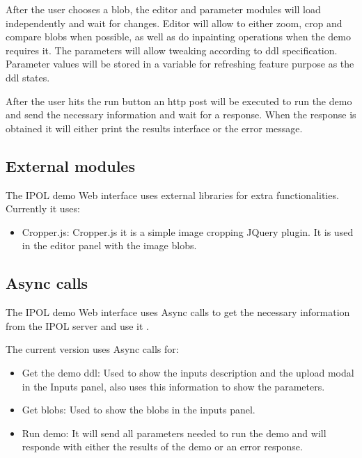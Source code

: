 After the user chooses a blob, the editor and parameter modules will load independently and wait for changes. Editor  will allow to either 
zoom, crop   and compare blobs when  possible, as well as do inpainting operations when the demo requires it. The parameters will allow  
tweaking  according to ddl  specification. Parameter values will be stored in a variable for refreshing feature purpose as the ddl states. 

After the user hits the run button an http post will be executed to run the demo and send the necessary information and wait for a response. 
When the response is obtained it will either print the results interface or the error message.


\subsection{External modules}

The IPOL demo Web interface uses external libraries for extra functionalities.
Currently it uses:

\begin{itemize}
\item Cropper.js: Cropper.js it is a simple image cropping JQuery plugin. It is used in the editor panel with the image blobs.
\end{itemize}


\subsection{Async calls}
The IPOL demo Web interface uses Async calls to get the necessary information from the IPOL server and use it .

The current version uses Async calls for:
\begin{itemize}
\item Get the demo ddl: Used to show the inputs description and the upload modal in the Inputs panel, also uses this information to show the parameters.
\item Get blobs: Used to show the blobs in the inputs panel.
\item Run demo: It will send all parameters needed to run the demo and will responde with either the results of the demo or an error response.
\end{itemize}

